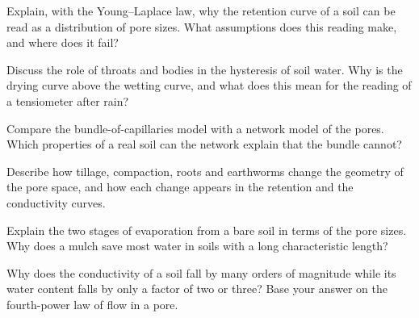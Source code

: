 \begin{exlist}
\item Explain, with the Young--Laplace law, why the retention curve of a soil can be read as a distribution of pore sizes. What assumptions does this reading make, and where does it fail?
\item Discuss the role of throats and bodies in the hysteresis of soil water. Why is the drying curve above the wetting curve, and what does this mean for the reading of a tensiometer after rain?
\item Compare the bundle-of-capillaries model with a network model of the pores. Which properties of a real soil can the network explain that the bundle cannot?
\item Describe how tillage, compaction, roots and earthworms change the geometry of the pore space, and how each change appears in the retention and the conductivity curves.
\item Explain the two stages of evaporation from a bare soil in terms of the pore sizes. Why does a mulch save most water in soils with a long characteristic length?
\item Why does the conductivity of a soil fall by many orders of magnitude while its water content falls by only a factor of two or three? Base your answer on the fourth-power law of flow in a pore.
\end{exlist}
